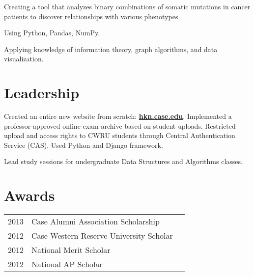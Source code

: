 \documentclass[letterpaper]{deedy-resume} %
\begin{document}
\begin{minipage}[t]{0.66\textwidth}


\begin{tightitemize}
\item Creating a tool that analyzes binary combinations of somatic mutations in
  cancer patients to discover relationships with various phenotypes.
\item Using Python, Pandas, NumPy.
\item Applying knowledge of information theory, graph algorithms, and data
  visualization.
\end{tightitemize}

\sectionspace %


\section{Leadership}


\begin{tightitemize}
\item Created an entire new website from scratch:
  \textbf{\href{https://hkn.case.edu}{hkn.case.edu}}.  Implemented a
  professor-approved online exam archive based on student uploads.  Restricted
  upload and access rights to CWRU students through Central Authentication
  Service (CAS).  Used Python and Django framework.
\item Lead study sessions for undergraduate Data Structures and Algorithms
  classes.
\end{tightitemize}

\sectionspace %


\section{Awards}

\begin{tabular}{rll}
2013 & Case Alumni Association Scholarship \\
2012 & Case Western Reserve University Scholar \\
2012 & National Merit Scholar \\
2012 & National AP Scholar
\end{tabular}


\end{minipage}
\end{document}
